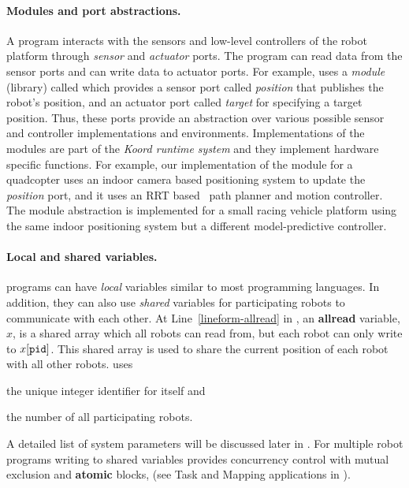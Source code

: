 \paragraph{Modules and port abstractions.}
A \lgname program interacts with the sensors and low-level controllers of the robot platform through \emph{sensor} and \emph{actuator} ports.
%
%
The program can read data from the sensor ports and can write data to actuator ports.
%
For example, \LineForm uses a \emph{module} (library) called \Motion which provides a sensor port called \emph{position} that publishes the robot's position, and an actuator port called \emph{target} for specifying a target position.
%
Thus, these  ports provide an abstraction over various possible sensor and controller implementations and environments.
%
Implementations of the modules are part of the {\em Koord runtime system\/} and they implement hardware specific functions.
For example, our implementation of the \Motion module for a quadcopter uses an indoor camera based positioning system to update the \emph{position} port,
and it uses an RRT based~\cite{lavalle1998rapidly} path planner and motion controller.
%
The \Motion module abstraction is implemented for a small racing vehicle platform using the same indoor positioning system but a different model-predictive controller.


%
%

\paragraph{Local and shared variables.}
\lgname programs can have  \emph{local} variables similar to most programming languages.
In addition, they can also use \emph{shared} variables for participating robots to communicate with each other.
At Line~\ref{lineform-allread} in ,
an \textbf{allread} variable, $x$, is a shared array which all robots can read from,
but each robot \myuin can only write to $x[\texttt{pid}]$.
This shared array is used to share the current position of each robot with all other robots.
\LineForm uses
\begin{inparaenum}[(a)]
    \item the unique integer identifier \myuin for itself and
    \item the number \NMAX of all participating robots.
\end{inparaenum}
A detailed list of system parameters will be discussed later in .
For multiple robot programs writing to shared variables
\lgname provides concurrency control with mutual exclusion and \textbf{atomic} blocks,
(see \textsf{Task} and \textsf{Mapping} applications in ).


